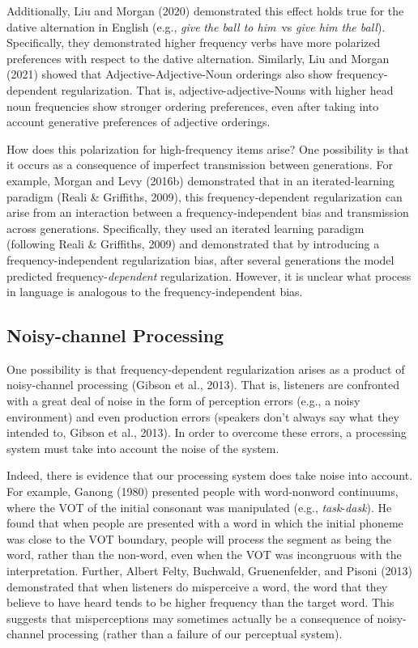 \documentclass[
  jou,floatsintext]{apa6}
\begin{document}
Additionally, Liu and Morgan (2020) demonstrated this effect holds true for the dative alternation in English (e.g., \emph{give} \emph{the ball to him}~vs \emph{give him the ball}). Specifically, they demonstrated higher frequency verbs have more polarized preferences with respect to the dative alternation. Similarly, Liu and Morgan (2021) showed that Adjective-Adjective-Noun orderings also show frequency-dependent regularization. That is, adjective-adjective-Nouns with higher head noun frequencies show stronger ordering preferences, even after taking into account generative preferences of adjective orderings.

How does this polarization for high-frequency items arise? One possibility is that it occurs as a consequence of imperfect transmission between generations. For example, Morgan and Levy (2016b) demonstrated that in an iterated-learning paradigm (Reali \& Griffiths, 2009), this frequency-dependent regularization can arise from an interaction between a frequency-independent bias and transmission across generations. Specifically, they used an iterated learning paradigm (following Reali \& Griffiths, 2009) and demonstrated that by introducing a frequency-independent regularization bias, after several generations the model predicted frequency-\emph{dependent} regularization. However, it is unclear what process in language is analogous to the frequency-independent bias.

\subsection{Noisy-channel Processing}\label{noisy-channel-processing}

One possibility is that frequency-dependent regularization arises as a product of noisy-channel processing (Gibson et al., 2013). That is, listeners are confronted with a great deal of noise in the form of perception errors (e.g., a noisy environment) and even production errors (speakers don't always say what they intended to, Gibson et al., 2013). In order to overcome these errors, a processing system must take into account the noise of the system.

Indeed, there is evidence that our processing system does take noise into account. For example, Ganong (1980) presented people with word-nonword continuums, where the VOT of the initial consonant was manipulated (e.g., \emph{task}-\emph{dask}). He found that when people are presented with a word in which the initial phoneme was close to the VOT boundary, people will process the segment as being the word, rather than the non-word, even when the VOT was incongruous with the interpretation. Further, Albert Felty, Buchwald, Gruenenfelder, and Pisoni (2013) demonstrated that when listeners do misperceive a word, the word that they believe to have heard tends to be higher frequency than the target word. This suggests that misperceptions may sometimes actually be a consequence of noisy-channel processing (rather than a failure of our perceptual system).
\end{document}
